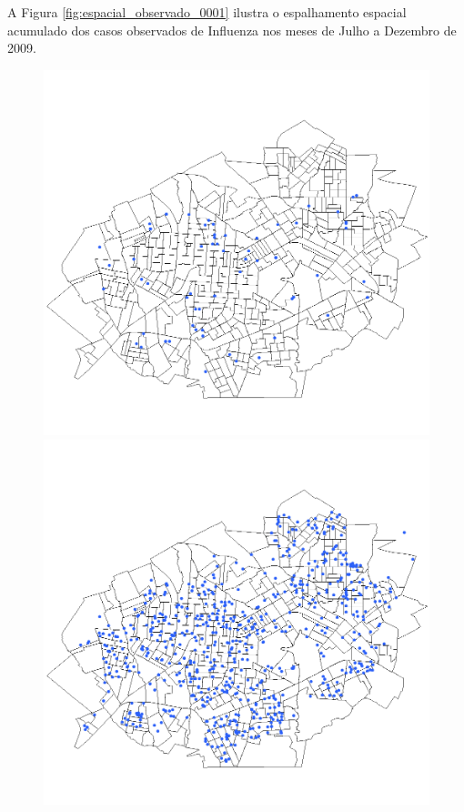 A Figura \ref{fig:espacial_observado_0001} ilustra o espalhamento espacial acumulado dos casos observados de Influenza nos meses de Julho a Dezembro de 2009.

\begin{figure}[H]
  \centering
  \begin{minipage}{.45\textwidth}
    \centering
    \includegraphics[width=1.0\textwidth]{Figuras/Resultados/Observado/01-07-2009.png}
    \captionsetup{labelformat=empty}
  \end{minipage}%
  \begin{minipage}{.45\textwidth}
    \centering
    \includegraphics[width=1.0\textwidth]{Figuras/Resultados/Observado/01-08-2009.png}

\end{minipage}
\end{figure}
